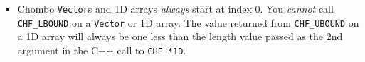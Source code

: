 \begin{itemize}
\item Chombo {\tt Vector}s and 1D arrays {\em always} start at index 0.  You
{\em cannot} call {\tt CHF\_LBOUND} on a {\tt Vector} or 1D array.  The value
returned from {\tt CHF\_UBOUND} on a 1D array will always be one less than the
length value passed as the 2nd argument in the C++ call to {\tt CHF\_*1D}.

\end{itemize}
%

